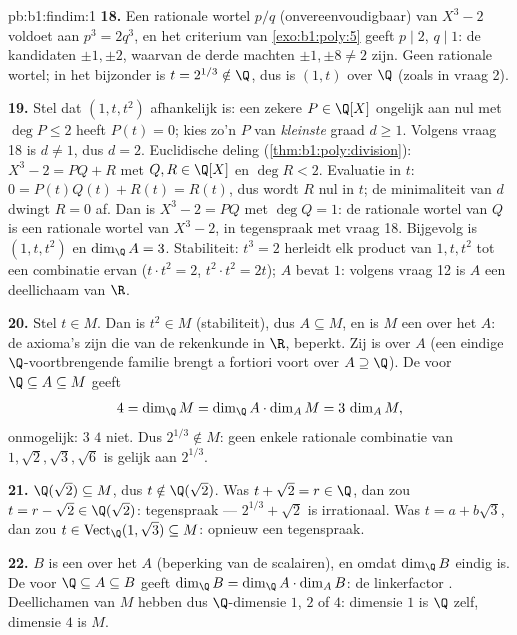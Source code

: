 \begin{solution}{pb:b1:findim:1}
\textbf{18.} Een rationale wortel $p/q$ (onvereenvoudigbaar) van
$X^3 - 2$ voldoet aan $p^3 = 2q^3$, en het criterium van
\cref{exo:b1:poly:5} geeft $p \mid 2$, $q \mid 1$: de kandidaten
$\pm1, \pm2$, waarvan de derde machten $\pm1, \pm8 \neq 2$ zijn.
Geen rationale wortel; in het bijzonder is $t = 2^{1/3} \notin \Q$,
dus is $(1, t)$  over $\Q$ (zoals in vraag 2).

\textbf{19.} Stel dat $(1, t, t^2)$ afhankelijk is: een zekere $P
\in \Q[X]$ ongelijk aan nul met $\deg P \leq 2$ heeft $P(t) = 0$;
kies zo'n $P$ van \emph{kleinste} graad $d \geq 1$. Volgens vraag
18 is $d \neq 1$, dus $d = 2$. Euclidische deling
(\cref{thm:b1:poly:division}): $X^3 - 2 = PQ + R$ met $Q, R \in
\Q[X]$ en $\deg R < 2$. Evaluatie in $t$: $0 = P(t)Q(t) + R(t) =
R(t)$, dus wordt $R$ nul in $t$; de minimaliteit van $d$ dwingt $R
= 0$ af. Dan is $X^3 - 2 = PQ$ met $\deg Q = 1$: de rationale
wortel van $Q$ is een rationale wortel van $X^3 - 2$, in
tegenspraak met vraag 18. Bijgevolg is $(1, t, t^2)$  en
$\dim_\Q A = 3$. Stabiliteit: $t^3 = 2$ herleidt elk product van
$1, t, t^2$ tot een combinatie ervan ($t\cdot t^2 = 2$, $t^2\cdot
t^2 = 2t$); $A$ bevat $1$: volgens vraag 12 is $A$ een deellichaam
van $\R$.

\textbf{20.} Stel $t \in M$. Dan is $t^2 \in M$ (stabiliteit), dus
$A \subseteq M$, en is $M$ een  over het  $A$:
de axioma's zijn die van de rekenkunde in $\R$, beperkt. Zij is
 over $A$ (een eindige $\Q$-voortbrengende
familie brengt a fortiori voort over $A \supseteq \Q$). De
 voor $\Q \subseteq A \subseteq M$ geeft
\[
4 = \dim_\Q M = \dim_\Q A \cdot \dim_A M = 3\,\dim_A M ,
\]
onmogelijk: $3$  $4$ niet. Dus $2^{1/3} \notin M$: geen enkele
rationale combinatie van $1, \sqrt2, \sqrt3, \sqrt6$ is gelijk aan
$2^{1/3}$.

\textbf{21.} $\Q(\sqrt2) \subseteq M$, dus $t \notin \Q(\sqrt2)$.
Was $t + \sqrt2 = r \in \Q$, dan zou $t = r - \sqrt2 \in
\Q(\sqrt2)$: tegenspraak --- $2^{1/3} + \sqrt2$ is irrationaal. Was
$t = a + b\sqrt3$, dan zou $t \in \operatorname{Vect}_\Q(1,
\sqrt3) \subseteq M$: opnieuw een tegenspraak.

\textbf{22.} $B$ is een  over het  $A$
(beperking van de scalairen), en  omdat $\dim_\Q
B$ eindig is. De  voor $\Q \subseteq A \subseteq B$ geeft
$\dim_\Q B = \dim_\Q A \cdot \dim_A B$: de linkerfactor .
Deellichamen van $M$ hebben dus $\Q$-dimensie $1$, $2$ of $4$:
dimensie $1$ is $\Q$ zelf, dimensie $4$ is $M$.


\end{solution}
